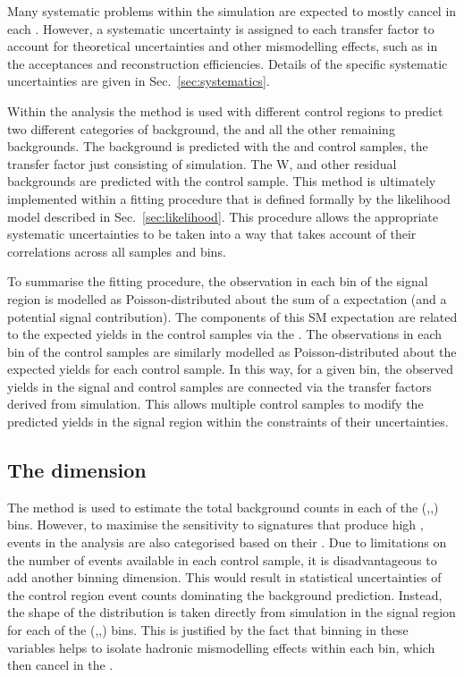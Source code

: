 Many systematic problems within the simulation are expected to mostly
cancel in each \TF. However, a systematic uncertainty is assigned to
each transfer factor to account for theoretical uncertainties and
other mismodelling effects, such as in the acceptances and
reconstruction efficiencies. Details of the specific systematic
uncertainties are given in Sec.~\ref{sec:systematics}.

Within the analysis the \TF method is used with different control
regions to predict two different categories of background, the \znunu
and all the other remaining backgrounds. The \znunu background is
predicted with the \gj and \mmj control samples, the transfer factor
just consisting of \znunu simulation. The W, \ttbar and other residual
backgrounds are predicted with the \mj control sample. This method is
ultimately implemented within a fitting procedure that is defined
formally by the likelihood model described in
Sec.~\ref{sec:likelihood}. This procedure allows the appropriate
systematic uncertainties to be taken into a way that takes account of
their correlations across all samples and bins.

To summarise the fitting procedure, the observation in each bin of the
signal region is modelled as Poisson-distributed about the sum of a
\SM expectation (and a potential signal contribution). The components
of this SM expectation are related to the expected yields in the
control samples via the \TFs. The observations in each bin of the
control samples are similarly modelled as Poisson-distributed about
the expected yields for each control sample. In this way, for a given
bin, the observed yields in the signal and control samples are
connected via the transfer factors derived from simulation.  This
allows multiple control samples to modify the predicted yields in the
signal region within the constraints of their uncertainties.

\subsection{The \MHT dimension}
\label{sec:mhtDim}

The \TF method is used to estimate the total background counts in each
of the (\HT,\nj,\nb) bins. However, to maximise the sensitivity to
\BSM signatures that produce high \MET, events in the analysis are also
categorised based on their \MHT. Due to limitations on the
number of events available in each control sample, it is
disadvantageous to add another binning
dimension. This would result in statistical uncertainties of the
control region event counts dominating the background prediction.
Instead, the shape of the \MHT distribution is taken directly from
simulation in the signal region for each of the (\HT,\nj,\nb) bins.
This is justified by the fact that binning in these variables helps to
isolate hadronic mismodelling effects within each bin, which then
cancel in the \TFs. 

